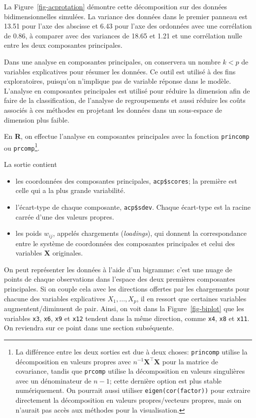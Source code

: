 \documentclass[
  11pt,
  letterpaper,
]{scrbook}
\providecommand{\tightlist}{%
  \setlength{\itemsep}{0pt}\setlength{\parskip}{0pt}}\usepackage{longtable,booktabs,array}
\theoremstyle{definition}
\theoremstyle{remark}
\begin{document}
La Figure~\ref{fig-acprotation} démontre cette décomposition sur des
données bidimensionnelles simulées. La variance des données dans le
premier panneau est 13.51 pour l'axe des abscisse et 6.43 pour l'axe des
ordonnées avec une corrélation de 0.86, à comparer avec des variances de
18.65 et 1.21 et une corrélation nulle entre les deux composantes
principales.

Dans une analyse en composantes principales, on conservera un nombre
\(k<p\) de variables explicatives pour résumer les données. Ce outil est
utilisé à des fins exploratoires, puisqu'on n'implique pas de variable
réponse dans le modèle. L'analyse en composantes principales est utilisé
pour réduire la dimension afin de faire de la classification, de
l'analyse de regroupements et aussi réduire les coûts associés à ces
méthodes en projetant les données dans un sous-espace de dimension plus
faible.

En \textbf{R}, on effectue l'analyse en composantes principales avec la
fonction \texttt{princomp} ou \texttt{prcomp}\footnote{La différence
  entre les deux sorties est due à deux choses: \texttt{princomp}
  utilise la décomposition en valeurs propres avec
  \(n^{-1}\mathbf{X}^\top\mathbf{X}\) pour la matrice de covariance,
  tandis que \texttt{prcomp} utilise la décomposition en valeurs
  singulières avec un dénominateur de \(n-1\); cette dernière option est
  plus stable numériquement. On pourrait aussi utiliser
  \texttt{eigen(cor(factor))} pour extraire directement la décomposition
  en valeurs propres/vecteurs propres, mais on n'aurait pas accès aux
  méthodes pour la visualisation.}.

La sortie contient

\begin{itemize}
\tightlist
\item
  les coordonnées des composantes principales, \texttt{acp\$scores}; la
  première est celle qui a la plus grande variabilité.
\item
  l'écart-type de chaque composante, \texttt{acp\$sdev}. Chaque
  écart-type est la racine carrée d'une des valeurs propres.
\item
  les poids \(w_{ij}\), appelés chargements (\emph{loadings}), qui
  donnent la correspondance entre le système de coordonnées des
  composantes principales et celui des variables \(\boldsymbol{X}\)
  originales.
\end{itemize}

On peut représenter les données à l'aide d'un bigramme: c'est une nuage
de points de chaque observations dans l'espace des deux premières
composantes principales. Si on couple cela avec les directions offertes
par les chargements pour chacune des variables explicatives
\(X_1, \ldots, X_p\), il en ressort que certaines variables
augmentent/diminuent de pair. Ainsi, on voit dans la
Figure~\ref{fig-biplot} que les variables \texttt{x3}, \texttt{x6},
\texttt{x9} et \texttt{x12} tendent dans la même direction, comme
\texttt{x4}, \texttt{x8} et \texttt{x11}. On reviendra sur ce point dans
une section subséquente.
\end{document}
